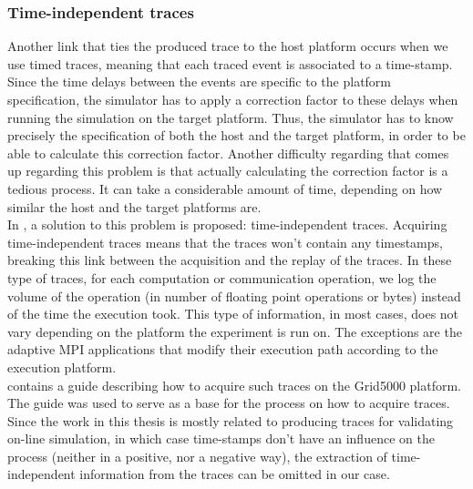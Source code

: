 \subsubsection{Time-independent traces}
Another link that ties the produced trace to the host platform occurs
when we use timed traces, meaning that each traced event is associated
to a time-stamp. Since the time delays between the events are specific
to the platform specification, the simulator has to apply a correction
factor to these delays when running the simulation on the target
platform. Thus, the simulator has to know precisely the specification
of both the host and the target platform, in order to be able to
calculate this correction factor. Another difficulty regarding that
comes up regarding this problem is that actually calculating the
correction factor is a tedious process. It can take a considerable
amount of time, depending on how similar the host and the target
platforms are.\cite{dmsq11}\\[0.3cm]
In \cite{dmsq11}, a solution to this problem is proposed:
time-independent traces. Acquiring time-independent traces means that
the traces won't contain any timestamps, breaking this link between
the acquisition and the replay of the traces. In these type of traces,
for each computation or communication operation, we log the volume of
the operation (in number of floating point operations or bytes)
instead of the time the execution took. This type of information, in
most cases, does not vary depending on the platform the experiment is
run on. The exceptions are the adaptive MPI applications that modify
their execution path according to the execution platform.\\[0.3cm]
\cite{ms11} contains a guide describing how to acquire such traces on
the Grid5000 platform. The guide was used to serve as a base for the
process on how to acquire traces. Since the work in this thesis is
mostly related to producing traces for validating on-line simulation,
in which case time-stamps don't have an influence on the process
(neither in a positive, nor a negative way), the extraction of
time-independent information from the traces can be omitted in our
case.
